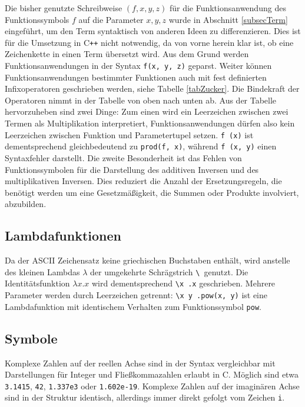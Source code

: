 Die bisher genutzte Schreibweise $(f, x, y, z)$ für die Funktionsanwendung des Funktionssymbols $f$ auf die Parameter $x, y, z$ wurde in Abschnitt \ref{subsecTerm} eingeführt, um den Term syntaktisch von anderen Ideen zu differenzieren. Dies ist für die Umsetzung in C\texttt{++} nicht notwendig, da von vorne herein klar ist, ob eine Zeichenkette in einen Term übersetzt wird. Aus dem Grund werden Funktionsanwendungen in der Syntax \verb|f(x, y, z)| geparst. 
Weiter können Funktionsanwendungen bestimmter Funktionen auch mit fest definierten Infixoperatoren geschrieben werden, siehe Tabelle \ref{tabZucker}. Die Bindekraft der Operatoren nimmt in der Tabelle von oben nach unten ab.
Aus der Tabelle hervorzuheben sind zwei Dinge: Zum einen wird ein Leerzeichen zwischen zwei Termen als Multiplikation interpretiert, Funktionsanwendungen dürfen also kein Leerzeichen zwischen Funktion und Parametertupel setzen. \verb|f (x)| ist dementsprechend gleichbedeutend zu \verb|prod(f, x)|, während \verb|f (x, y)| einen Syntaxfehler darstellt. Die zweite Besonderheit ist das Fehlen von Funktionssymbolen für die Darstellung des additiven Inversen und des multiplikativen Inversen. Dies reduziert die Anzahl der Ersetzungsregeln, die benötigt werden um eine Gesetzmäßigkeit, die Summen oder Produkte involviert, abzubilden. 

\subsection{Lambdafunktionen} \label{subsubsecLambdaSyntax}
Da der ASCII Zeichensatz keine griechischen Buchstaben enthält, wird anstelle des kleinen Lambdas $\lambda$ der umgekehrte Schrägstrich \verb~\ ~genutzt. Die Identitätsfunktion $\lambda x.x$ wird dementsprechend \verb~\x .x~ geschrieben. Mehrere Parameter werden durch Leerzeichen getrennt: \verb~\x y .pow(x, y)~ ist eine Lambdafunktion mit identischem Verhalten zum Funktionssymbol \verb|pow|.

\subsection{Symbole}
Komplexe Zahlen auf der reellen Achse sind in der Syntax vergleichbar mit Darstellungen für Integer und Fließkommazahlen erlaubt in C. Möglich sind etwa \verb|3.1415|, \verb|42|, \verb|1.337e3| oder \verb|1.602e-19|. Komplexe Zahlen auf der imaginären Achse sind in der Struktur identisch, allerdings immer direkt gefolgt vom Zeichen \verb|i|. 

